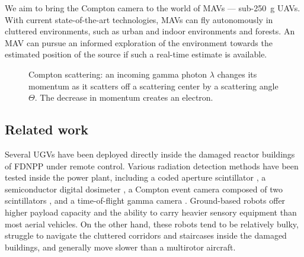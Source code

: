 \documentclass[a4paper,11pt,titlepage,twoside]{book}
\begin{document}

We aim to bring the Compton camera to the world of \acp{MAV} --- sub-\SI{250}{\gram} \acp{UAV}.
With current state-of-the-art technologies, \acp{MAV} can fly autonomously in cluttered environments, such as urban and indoor environments and forests.
An \ac{MAV} can pursue an informed exploration of the environment towards the estimated position of the source if such a real-time estimate is available.


\begin{figure}[!b]
  \centering
  \resizebox{0.25\textwidth}{!}{%
    
  }
  \caption{
    Compton scattering: an incoming gamma photon $\lambda$ changes its momentum as it scatters off a scattering center by a scattering angle $\Theta$.
    The decrease in momentum creates an electron.
  }
  \label{fig:compton_scattering}
\end{figure}



\subsection{Related work}



Several \acp{UGV} have been deployed directly inside the damaged reactor buildings of \ac{FDNPP} under remote control.
Various radiation detection methods have been tested inside the power plant, including a coded aperture scintillator \cite{ohno2011robotic}, a semiconductor digital dosimeter \cite{nagatani2013emergency}, a Compton event camera composed of two scintillators \cite{sato2019radiation}, and a time-of-flight gamma camera \cite{kinoshita2014development}.
Ground-based robots offer higher payload capacity and the ability to carry heavier sensory equipment than most aerial vehicles.
On the other hand, these robots tend to be relatively bulky, struggle to navigate the cluttered corridors and staircases inside the damaged buildings, and generally move slower than a multirotor aircraft.
\end{document}
